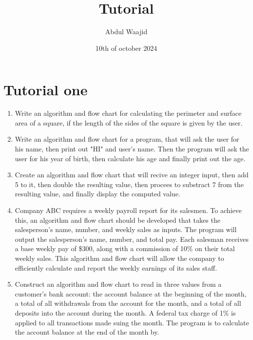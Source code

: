 \documentclass[]{book}
\title{Tutorial}
\author{Abdul Waajid}
\date{10th of october 2024}
\begin{document}
\maketitle
\section{Tutorial one}
\begin{enumerate}
    \item Write an algorithm and flow chart for calculating the perimeter and surface area of a square,
        if the length of the sides of the square is given by the user.

        \begin{flowchart}
            \start
            
             
        \end{flowchart}
        

    \item Write an algorithm and flow chart for a program, that will ask the user for his name, then print out "HI" and user's name. Then the program 
        will ask the user for his year of birth, then calculate his age and finally print out the age.

    \item Create an algorithm and flow chart that will recive an integer input, then add 5 to it, then double the resulting value, then procees to substract 7 
        from the resulting value, and finally display the computed value.

    \item  Company ABC requires a weekly payroll report for its salesmen. To achieve this,
        an algorithm and flow chart should be developed that takes the salesperson's
        name, number, and weekly sales as inputs.  The program will output the salesperson's name, number, and total pay. 
        Each salesman receives a base weekly pay of \$300, along with a commission of 10\% on their total 
        weekly sales. This algorithm and flow chart will allow the company to efficiently calculate and report the weekly earnings of its sales staff.

    \item Construct an algorithm and flow chart to read in three values from a customer’s bank account: the account
    balance at the beginning of the month, a total of all withdrawals from the account for the month,
    and a total of all deposits into the account during the month. A federal tax charge of 1\% is
    applied to all transactions made suing the month. The program is to calculate the account
    balance at the end of the month by.



\end{enumerate}
\end{document}
